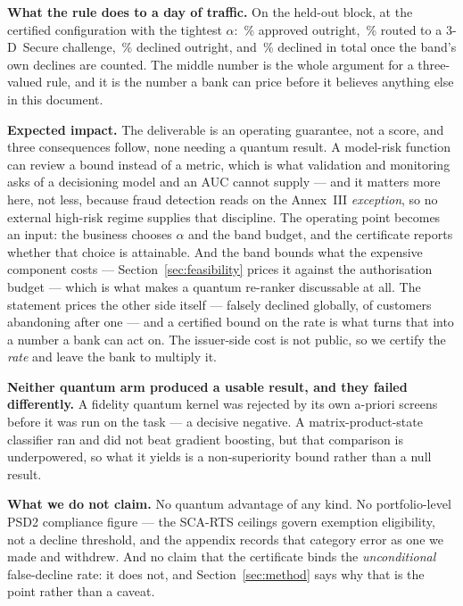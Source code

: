 \textbf{What the rule does to a day of traffic.} On the held-out block, at the certified
configuration with the tightest $\alpha$: \ClaimOperatingApproveShare\,\% approved outright,
\ClaimOperatingStepUpShare\,\% routed to a 3-D~Secure challenge, \ClaimOperatingDeclineShare\,\%
declined outright, and \ClaimOperatingTerminalDeclineShare\,\% declined in total once the band's
own declines are counted. The middle number is the whole argument for a three-valued rule, and it is the
number a bank can price before it believes anything else in this document.

\textbf{Expected impact.} The deliverable is an operating guarantee, not a score, and three
consequences follow, none needing a quantum result. A model-risk function
can review a bound instead of a metric, which is what validation and monitoring
 asks of a decisioning model and an AUC cannot supply --- and it matters more
here, not less, because fraud detection reads on the  Annex~III
\emph{exception}, so no external high-risk regime supplies that discipline. The operating point becomes an input: the business
chooses $\alpha$ and the band budget, and the certificate reports whether that choice is
attainable. And the band bounds what the expensive component costs ---
Section~\ref{sec:feasibility} prices it against the authorisation budget --- which is what makes
a quantum re-ranker discussable at all. The statement prices the other side itself ---
 falsely declined globally,  of customers abandoning after
one --- and a certified bound on the rate is what turns that into a number a bank can act on. The
issuer-side cost is not public, so we certify the \emph{rate} and leave the bank to multiply
it.

\textbf{Neither quantum arm produced a usable result, and they failed differently.} A fidelity
quantum kernel was rejected by its own a-priori screens before it was run on the task --- a
decisive negative. A matrix-product-state classifier ran and did not beat gradient boosting, but
that comparison is underpowered, so what it yields is a non-superiority bound rather than a null
result.

\textbf{What we do not claim.} No quantum advantage of any kind. No portfolio-level PSD2
compliance figure --- the SCA-RTS ceilings govern exemption eligibility, not a decline threshold,
and the appendix records that category error as one we made and withdrew. And no claim that the
certificate binds the \emph{unconditional} false-decline rate: it does not, and
Section~\ref{sec:method} says why that is the point rather than a caveat.
